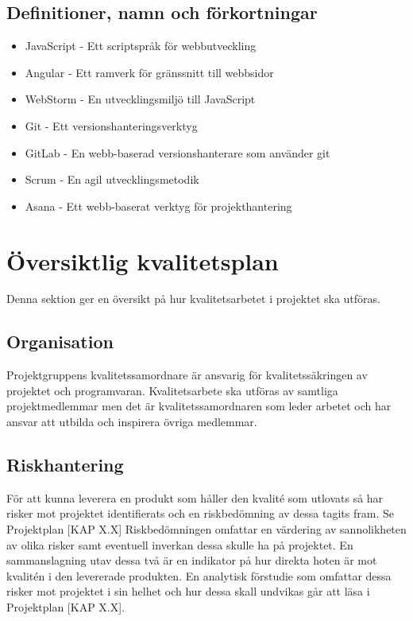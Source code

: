 \documentclass[a4paper,10pt]{article}
\begin{document}
\subsection{Definitioner, namn och förkortningar}

\begin{itemize}
\vspace{5mm}
    \item JavaScript - Ett scriptspråk för webbutveckling
    \item Angular - Ett ramverk för gränssnitt till webbsidor
    \item WebStorm - En utvecklingsmiljö till JavaScript
    \item Git - Ett versionshanteringsverktyg
    \item GitLab - En webb-baserad versionshanterare som använder git
    \item Scrum - En agil utvecklingsmetodik
    \item Asana - Ett webb-baserat verktyg för projekthantering
\end{itemize}

\section{Översiktlig kvalitetsplan}

Denna sektion ger en översikt på hur kvalitetsarbetet i projektet ska utföras.

\subsection{Organisation}

Projektgruppens kvalitetssamordnare är ansvarig för kvalitetssäkringen av projektet och  programvaran. Kvalitetsarbete ska utföras av samtliga projektmedlemmar men det är kvalitetssamordnaren som leder arbetet och har ansvar att utbilda och inspirera övriga medlemmar.

\subsection{Riskhantering}

För att kunna leverera en produkt som håller den kvalité som utlovats så har risker mot projektet identifierats och en riskbedömning av dessa tagits fram. Se Projektplan [KAP X.X] 
Riskbedömningen omfattar en värdering av sannolikheten av olika risker samt eventuell inverkan dessa skulle ha på projektet. En sammanslagning utav dessa två är en indikator på hur direkta hoten är mot kvalitén i den levererade produkten.
En analytisk förstudie som omfattar dessa risker mot projektet i sin helhet och hur dessa skall undvikas går att läsa i Projektplan [KAP X.X]. 
\end{document}
